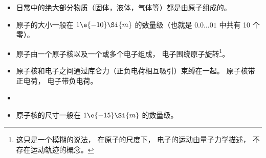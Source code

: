 
\begin{issues}
\issueDraft
\end{issues}

\begin{itemize}
\item 日常中的绝大部分物质（固体，液体，气体等）都是由原子组成的。
\item 原子的大小一般在 $1\e{-10}\Si{m}$ 的数量级（也就是 $0.0\dots01$ 中共有 10 个零）。
\item 原子由一个原子核以及一个或多个电子组成， 电子围绕原子旋转\footnote{这只是一个模糊的说法， 在原子的尺度下， 电子的运动由量子力学描述， 不存在运动轨迹的概念。}。
\item 原子核和电子之间通过库仑力（正负电荷相互吸引）束缚在一起。 原子核带正电荷， 电子带负电荷。
\item 

\item 原子核的尺寸一般在 $1\e{-15}\Si{m}$ 的数量级。
\end{itemize}
